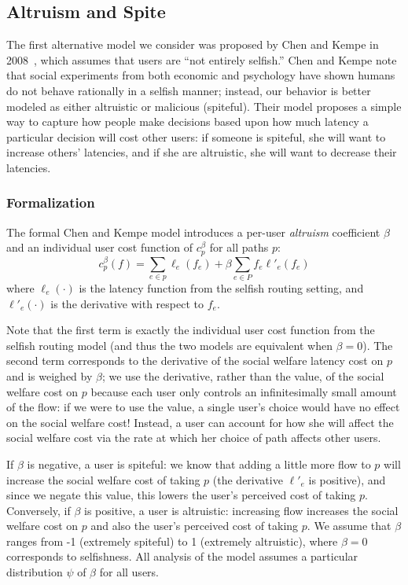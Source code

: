 \subsection{Altruism and Spite}
The first alternative model we consider was proposed by Chen and Kempe in 2008~\cite{chen}, which assumes that users are ``not entirely selfish.''
Chen and Kempe note that social experiments from both economic and psychology have shown humans do not behave rationally in a selfish manner; instead, our behavior is better modeled as either altruistic or malicious (spiteful).
Their model proposes a simple way to capture how people make decisions based upon how much latency a particular decision will cost other users: if someone is spiteful, she will want to increase others' latencies, and if she are altruistic, she will want to decrease their latencies.

\subsubsection{Formalization}
The formal Chen and Kempe model introduces a per-user \emph{altruism} coefficient $\beta$ and an individual user cost function
of $c^\beta_p$ for all paths $p$:
$$c^\beta_p(f) = \sum_{e \in p} \ell_e(f_e) + \beta\sum_{e\in P} f_e\ell'_e(f_e)$$
where $\ell_e(\cdot)$ is the latency function from the selfish routing setting, and $\ell'_e(\cdot)$ is the derivative with respect to $f_e$.

Note that the first term is exactly the individual user cost function from the selfish routing model (and thus the two models are equivalent when $\beta = 0$). The second term corresponds to the derivative of the social welfare latency cost on $p$ and is weighed by $\beta$; we use the derivative, rather than the value, of the social welfare cost on $p$ because each user only controls an infinitesimally small amount of the flow: if we were to use the value, a single user's choice would have no effect on the social welfare cost! 
Instead, a user can account for how she will affect the social welfare cost via the rate at which her choice of path affects other users.

If $\beta$ is negative, a user is spiteful: we know that adding a little more flow to $p$ will increase the social welfare cost of taking $p$ (the derivative $\ell'_e$ is positive), and since we negate this value, this lowers the user's perceived cost of taking $p$.
Conversely, if $\beta$ is positive, a user is altruistic: increasing flow increases the social welfare cost on $p$ and also the user's perceived cost of taking $p$.
We assume that $\beta$ ranges from -1 (extremely spiteful) to 1 (extremely altruistic), where $\beta=0$ corresponds to selfishness.
All analysis of the model assumes a particular distribution $\psi$ of $\beta$ for all users. 

